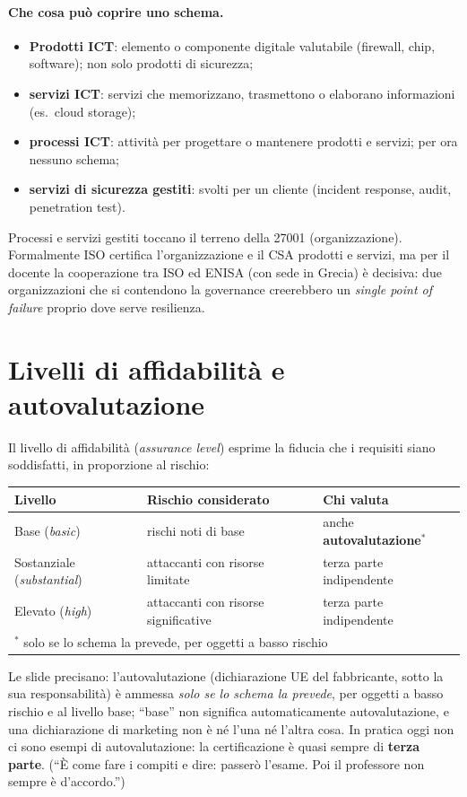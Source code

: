 \paragraph{Che cosa può coprire uno schema.}
\begin{itemize}
  \item \textbf{Prodotti ICT}: elemento o componente digitale valutabile (firewall, chip, software); non
    solo prodotti di sicurezza;
  \item \textbf{servizi ICT}: servizi che memorizzano, trasmettono o elaborano informazioni (es.\ cloud storage);
  \item \textbf{processi ICT}: attività per progettare o mantenere prodotti e servizi; per ora nessuno schema;
  \item \textbf{servizi di sicurezza gestiti}: svolti per un cliente (incident response, audit, penetration test).
\end{itemize}
Processi e servizi gestiti toccano il terreno della 27001 (organizzazione). Formalmente ISO certifica
l'organizzazione e il CSA prodotti e servizi, ma per il docente la cooperazione tra ISO ed ENISA
(con sede in Grecia) è decisiva: due organizzazioni che si contendono la governance creerebbero un
\emph{single point of failure} proprio dove serve resilienza.

\section{Livelli di affidabilità e autovalutazione}
Il livello di affidabilità (\emph{assurance level}) esprime la fiducia che i requisiti siano soddisfatti,
in proporzione al rischio:
\begin{center}
\small
\begin{tabular}{lll}
\toprule
\textbf{Livello} & \textbf{Rischio considerato} & \textbf{Chi valuta}\\
\midrule
Base (\emph{basic}) & rischi noti di base & anche \textbf{autovalutazione}$^{*}$\\
Sostanziale (\emph{substantial}) & attaccanti con risorse limitate & terza parte indipendente\\
Elevato (\emph{high}) & attaccanti con risorse significative & terza parte indipendente\\
\bottomrule
\multicolumn{3}{l}{\footnotesize $^{*}$ solo se lo schema la prevede, per oggetti a basso rischio}\\
\end{tabular}
\end{center}
Le slide precisano: l'autovalutazione (dichiarazione UE del fabbricante, sotto la sua responsabilità) è
ammessa \emph{solo se lo schema la prevede}, per oggetti a basso rischio e al livello base; ``base'' non
significa automaticamente autovalutazione, e una dichiarazione di marketing non è né l'una né l'altra cosa.
In pratica oggi non ci sono esempi di autovalutazione: la
certificazione è quasi sempre di \textbf{terza parte}. (``È come fare i compiti e dire: passerò l'esame.
Poi il professore non sempre è d'accordo.'')

